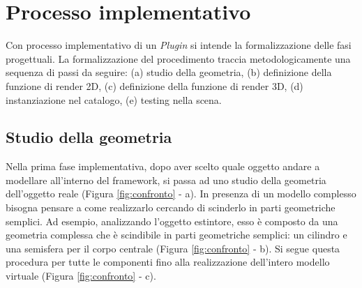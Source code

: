 \section{Processo implementativo}
\label{sec:chapter_3_section_5}

Con processo implementativo di un \emph{Plugin} si intende la formalizzazione delle fasi progettuali.
La formalizzazione del procedimento traccia metodologicamente una sequenza di passi da seguire:
(a) studio della geometria, (b) definizione della funzione di render 2D, (c) definizione della funzione di render 3D,
 (d) instanziazione nel catalogo, (e) testing nella scena.


\subsection{Studio della geometria}
Nella prima fase implementativa, dopo aver scelto quale oggetto andare a modellare all'interno del framework,
si passa ad uno studio della geometria dell'oggetto reale (Figura \ref{fig:confronto} - a).
In presenza di un modello complesso bisogna pensare a come realizzarlo cercando di scinderlo in parti geometriche semplici.
Ad esempio, analizzando l'oggetto estintore, esso è composto da una geometria complessa che è scindibile in parti geometriche
semplici: un cilindro e una semisfera per il corpo centrale (Figura \ref{fig:confronto} - b). Si segue questa procedura
per tutte le componenti fino alla realizzazione dell'intero modello virtuale (Figura \ref{fig:confronto} - c).\\

